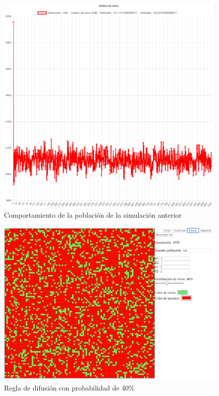 	\begin{figure}[H]
		\begin{center}
			\includegraphics[scale=.24]{GOL/img/dif30-2.png}
			\caption{Comportamiento de la población de la simulación anterior}
			\label{fig:gol5}
		\end{center}
	\end{figure}

	\begin{figure}[H]
		\begin{center}
			\includegraphics[scale=.3]{GOL/img/dif40-1.png}
			\caption{Regla de difusión con probabilidad de 40\%}
			\label{fig:gol5}
		\end{center}
	\end{figure}

